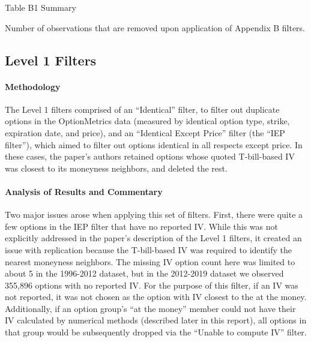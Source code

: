\thispagestyle{empty}
\begin{landscape}

\begin{table}
  \centering
  \caption{Table B1 Summary}
  \resizebox{1.4\textwidth}{!}{
  \hspace*{-4cm}
  
  }
  \caption*{
    Number of observations that are removed upon application of Appendix B filters. 
  }
  \label{table:tableB1}
\end{table}

\vfill
\raisebox{-3.5cm}{\makebox[\linewidth]{\thepage}}
\end{landscape}

\newpage
\subsection{Level 1 Filters} 


\paragraph{Methodology}


The Level 1 filters comprised of an ``Identical'' filter, to filter out duplicate options in the OptionMetrics data (measured by identical option type, strike, expiration date, and price), and an ``Identical Except Price'' filter (the ``IEP filter''), which aimed to filter out options identical in all respects except price. In these cases, the paper's authors retained options whose quoted T-bill-based IV was closest to its moneyness neighbors, and deleted the rest.

\paragraph{Analysis of Results and Commentary}
Two major issues arose when applying this set of filters. First, there were quite a few options in the IEP filter that have no reported IV. While this was not explicitly addressed in the paper's description of the Level 1 filters, it created an issue with replication because the T-bill-based IV was required to identify the nearest moneyness neighbors. The missing IV option count here was limited to about 5 in the 1996-2012 dataset, but in the 2012-2019 dataset we observed 355,896 options with no reported IV. For the purpose of this filter, if an IV was not reported, it was not chosen as the option with IV closest to the at the money. Additionally, if an option group's ``at the money'' member could not have their IV calculated by numerical methods (described later in this report), all options in that group would be subsequently dropped via the ``Unable to compute IV'' filter. 

